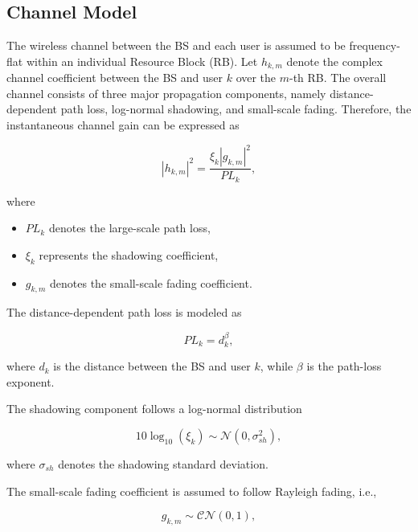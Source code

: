 \documentclass[conference]{IEEEtran}
\begin{document}
\subsection{Channel Model}

The wireless channel between the BS and each user is assumed to be frequency-flat within an individual Resource Block (RB). Let $h_{k,m}$ denote the complex channel coefficient between the BS and user $k$ over the $m$-th RB. The overall channel consists of three major propagation components, namely distance-dependent path loss, log-normal shadowing, and small-scale fading. Therefore, the instantaneous channel gain can be expressed as

\begin{equation}
|h_{k,m}|^2=
\frac{\xi_k |g_{k,m}|^2}
{PL_k},
\label{eq:channel_gain}
\end{equation}

where

\begin{itemize}
\item $PL_k$ denotes the large-scale path loss,
\item $\xi_k$ represents the shadowing coefficient,
\item $g_{k,m}$ denotes the small-scale fading coefficient.
\end{itemize}

The distance-dependent path loss is modeled as

\begin{equation}
PL_k=d_k^{\beta},
\label{eq:pathloss}
\end{equation}

where $d_k$ is the distance between the BS and user $k$, while $\beta$ is the path-loss exponent.

The shadowing component follows a log-normal distribution

\begin{equation}
10\log_{10}(\xi_k)\sim\mathcal{N}(0,\sigma_{sh}^2),
\end{equation}

where $\sigma_{sh}$ denotes the shadowing standard deviation.

The small-scale fading coefficient is assumed to follow Rayleigh fading, i.e.,

\begin{equation}
g_{k,m}\sim\mathcal{CN}(0,1),
\end{equation}
\end{document}
